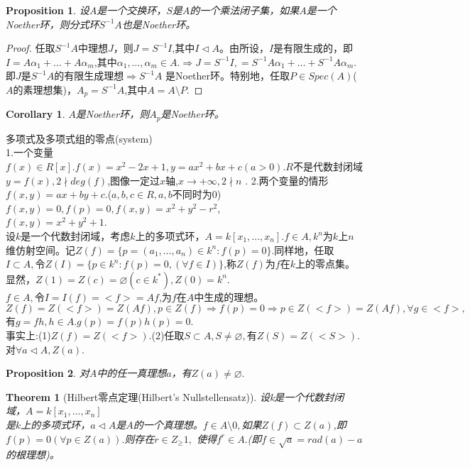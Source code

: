 \documentclass[UTF8]{article}
\newtheorem{thm}{Theorem}
\newtheorem{cor}{Corollary}
\newtheorem{prop}{Proposition}
\begin{document}
\begin{prop}
	设$A$是一个交换环，$S$是$A$的一个乘法闭子集，如果$A$是一个Noether环，则分式环$S^{-1}A$也是Noether环。
\end{prop}
\begin{proof}
	任取$S^{-1}A$中理想$J$，则$J=S^{-1}I$,其中$I\vartriangleleft  A$。由所设，$I$是有限生成的，即$I=A\alpha_1+\ldots+A\alpha_m$,其中$\alpha_1,\ldots,\alpha_m\in A.\Rightarrow J=S^{-1}I,=S^{-1}A\alpha_1+\ldots+S^{-1}A\alpha_m$.即$J$是$S^{-1}A$的有限生成理想$\Rightarrow S^{-1}A$ 是Noether环。特别地，任取$P\in Spec(A)$($A$的素理想集)，$A_p=S^{-1}A$,其中$A=A\setminus P$.
\end{proof}
\begin{cor}
	$A$是Noether环，则$A_p$是Noether环。
\end{cor}
多项式及多项式组的零点(system)\\
1.一个变量\\
$f(x)\in R[x].f(x)=x^2-2x+1,y=ax^2+bx+c(a>0)$.$R$不是代数封闭域\\
$y=f(x),2\nmid deg(f)$,图像一定过$x$轴,$x\rightarrow +\infty,2\nmid n$ .
2.两个变量的情形\\
$f(x,y)=ax+by+c$.($a,b,c\in R,a,b$不同时为$0$)
$f(x,y)=0,f(p)=0,f(x,y)=x^2+y^2-r^2$,\\
$f(x,y)=x^2+y^2+1$.\\
设$k$是一个代数封闭域，考虑$k$上的多项式环，$A=k[x_1,\ldots,x_n].f\in A,k^n$为$k$上$n$维仿射空间。记$Z(f)=\{p=(a_1,\ldots,a_n)\in k^n:f(p)=0\}$.同样地，任取$I\subset A,令Z(I)=\{p\in k^n:f(p)=0,(\forall f\in I)\}$,称$Z(f)$为$f$在$k$上的零点集。显然，$Z(1)=Z(c)=\varnothing(c\in k^*),Z(0)=k^n.$\\
$f\in A,$令$I=I(f)=<f>=Af$,为$f$在$A$中生成的理想。$Z(f)=Z(<f>)=Z(Af),p\in Z(f)\Rightarrow f(p)=0\Rightarrow p\in Z(<f>)=Z(Af),\forall g\in <f>,$有$g=fh,h\in A.g(p)=f(p)h(p)=0.$\\
事实上:(1)$Z(f)=Z(<f>)$.(2)任取$S\subset A,S\neq \varnothing,$有$Z(S)=Z(<S>).$\\
对$\forall a\vartriangleleft A,Z(a).$\\
\begin{prop}
	对$A$中的任一真理想$a$，有$Z(a)\neq \varnothing.$
\end{prop}
\begin{thm}[Hilbert零点定理(Hilbert's Nullstellensatz)]
	设k是一个代数封闭域，$A=k[x_1,\ldots,x_n]$\\
	是$k$上的多项式环，$a\vartriangleleft A$是$A$的一个真理想。$f\in A\setminus 0,$如果$Z(f)\subset Z(a)$,即$f(p)=0(\forall p\in Z(a)).$则存在$r\in Z_\geqslant1,$ 使得$f^r\in A.$(即$f\in\sqrt{a}=rad(a)-a$的根理想)。
\end{thm}
\end{document}
